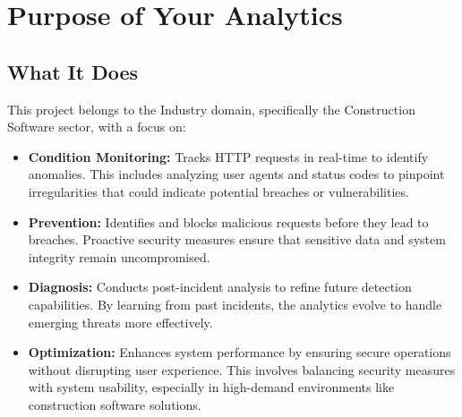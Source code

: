 %
%

\chapter{Purpose of Your Analytics}

\section{What It Does}

This project belongs to the Industry domain, specifically the Construction Software sector, with a focus on:

\begin{itemize}
	\item \textbf{Condition Monitoring:} Tracks HTTP requests in real-time to identify anomalies. This includes analyzing user agents and status codes to pinpoint irregularities that could indicate potential breaches or vulnerabilities.
	\item \textbf{Prevention:} Identifies and blocks malicious requests before they lead to breaches. Proactive security measures ensure that sensitive data and system integrity remain uncompromised.
	\item \textbf{Diagnosis:} Conducts post-incident analysis to refine future detection capabilities. By learning from past incidents, the analytics evolve to handle emerging threats more effectively.
	\item \textbf{Optimization:} Enhances system performance by ensuring secure operations without disrupting user experience. This involves balancing security measures with system usability, especially in high-demand environments like construction software solutions.
\end{itemize}

  

 